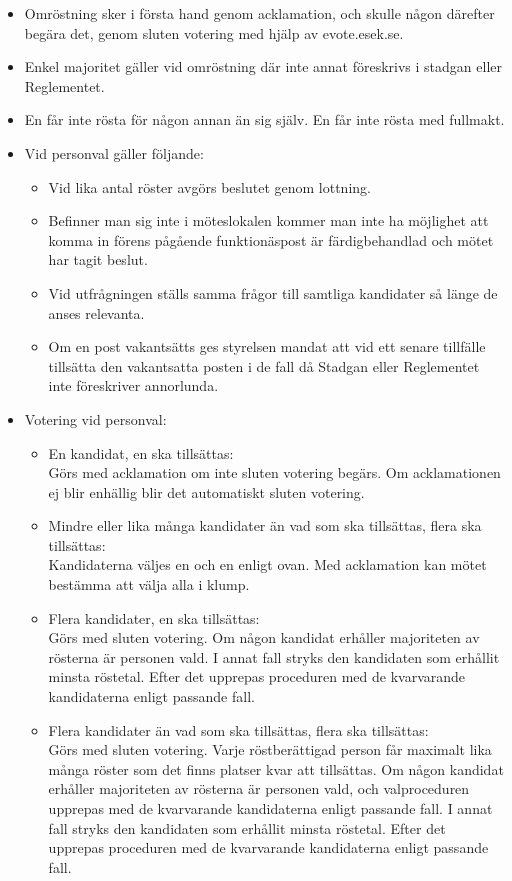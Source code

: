 \documentclass[2019-vm-handlingar.tex]{subfiles}
\begin{document}
    \begin{itemize}
    \item Omröstning sker i första hand genom acklamation, och skulle någon därefter begära det, genom sluten votering med hjälp av evote.esek.se.   
    \item Enkel majoritet gäller vid omröstning där inte annat föreskrivs i stadgan eller Reglementet. 
    \item En får inte rösta för någon annan än sig själv. En får inte rösta med fullmakt.
    \item Vid personval gäller följande:
        
        \begin{itemize}
        \item Vid lika antal röster avgörs beslutet genom lottning.
        \item Befinner man sig inte i möteslokalen kommer man inte ha möjlighet att komma in förens pågående funktionäspost är färdigbehandlad och mötet har tagit beslut.  
        \item Vid utfrågningen ställs samma frågor till samtliga kandidater så länge de anses relevanta.
        \item Om en post vakantsätts ges styrelsen mandat att vid ett senare tillfälle tillsätta den vakantsatta posten i de fall då Stadgan eller Reglementet inte föreskriver annorlunda.  
         \end{itemize}
    \item Votering vid personval:
    \begin{itemize}
        \item En kandidat, en ska tillsättas: 
        \\ Görs med acklamation om inte sluten votering begärs. Om acklamationen ej blir enhällig blir det automatiskt sluten votering.
        \item Mindre eller lika många kandidater än vad som ska tillsättas, flera ska tillsättas: 
        \\ Kandidaterna väljes en och en enligt ovan. Med acklamation kan mötet bestämma att välja alla i klump.
        \item Flera kandidater, en ska tillsättas:
        \\ Görs med sluten votering. Om någon kandidat erhåller majoriteten av rösterna är personen vald. I annat fall stryks den kandidaten som erhållit minsta röstetal. Efter det upprepas proceduren med de kvarvarande kandidaterna enligt passande fall.
        \newpage
        \item Flera kandidater än vad som ska tillsättas, flera ska tillsättas:
        \\ Görs med sluten votering. Varje röstberättigad person får maximalt lika många röster som det finns platser kvar att tillsättas. Om någon kandidat erhåller majoriteten av rösterna är personen vald, och valproceduren upprepas med de kvarvarande kandidaterna enligt passande fall. I annat fall stryks den kandidaten som erhållit minsta röstetal. Efter det upprepas proceduren med de kvarvarande kandidaterna enligt passande fall.
       \end{itemize}

    \end{itemize}
\end{document}
